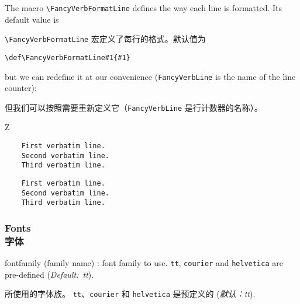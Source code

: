 \documentclass[twoside]{article}
\newcommand\cs[1]{\texttt{\textbackslash#1}}
\providecommand\optname[1]{\textsf{#1}}
\newenvironment{optlist}{\begin{description}%
  \renewcommand\makelabel[1]{%
    \descriptionlabel{\mdseries\optname{##1}}}%
  \itemsep0.25\itemsep}%
 {\end{description}}
\newcommand\verbatimTxt{抄录}
\begin{document}
% \begin{parcolumns}[rulebetween=true,colwidths={1=.6\linewidth}]{2}

The macro \cs{FancyVerbFormatLine} defines the way each line is formatted.
Its default value is

\cs{FancyVerbFormatLine} 宏定义了每行的格式。默认值为

\verb+\def\FancyVerbFormatLine#1{#1}+

but we can
redefine it at our convenience (\texttt{FancyVerbLine} is the name of the
line counter):

但我们可以按照需要重新定义它（\texttt{FancyVerbLine} 是行计数器的名称）。


{
\begin{SideBySideExample}
  Z
  \renewcommand{\FancyVerbFormatLine}[1]{%
    \makebox[0cm][l]{$\Rightarrow$}#1}
  \begin{Verbatim}
    First verbatim line.
    Second verbatim line.
    Third verbatim line.
  \end{Verbatim}
\end{SideBySideExample}

\begin{SideBySideExample}
  \renewcommand{\FancyVerbFormatLine}[1]{%
    \ifodd\value{FancyVerbLine}%
      \MakeUppercase{#1}\else#1\fi}
  \begin{Verbatim}
    First verbatim line.
    Second verbatim line.
    Third verbatim line.
  \end{Verbatim}
\end{SideBySideExample}
}

\subsubsection{Fonts\\字体}

\begin{optlist}
  \item[fontfamily (family name)]: font family to use.
  \texttt{tt}, \texttt{courier} and \texttt{helvetica} are pre-defined
  (\emph{Default:~tt}).

所使用的字体族。%
\texttt{tt}、\texttt{courier} 和 \texttt{helvetica} 是预定义的
(\emph{默认：tt}).
\end{optlist}
\end{document}
